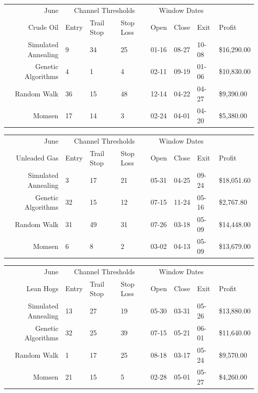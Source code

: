 \documentclass[12pt]{article}
\begin{document}
\begin{tabular}{|r|l|l|l|l|l|l|l|}
  \hline
  June & \multicolumn{3}{|c|}{Channel Thresholds} & \multicolumn{3}{|c|}{Window Dates} &  \\
  Crude Oil & Entry & Trail Stop & Stop Loss & Open & Close & Exit & Profit\\ \hline
  Simulated Annealing & 9 & 34 & 25 & 01-16 & 08-27 & 10-08 & \$16,290.00 \\ \hline
  Genetic Algorithms & 4 & 1 & 4 & 02-11 & 09-19 & 01-06 & \$10,830.00 \\ \hline
  Random Walk & 36 & 15 & 48 & 12-14 & 04-22 & 04-27 & \$9,390.00 \\ \hline
  Momsen & 17 & 14 & 3 & 02-24 & 04-01 & 04-20 & \$5,380.00 \\ \hline
\end{tabular}

\begin{tabular}{|r|l|l|l|l|l|l|l|}
  \hline
  June & \multicolumn{3}{|c|}{Channel Thresholds} & \multicolumn{3}{|c|}{Window Dates} &  \\
  Unleaded Gas & Entry & Trail Stop & Stop Loss & Open & Close & Exit & Profit\\ \hline
  Simulated Annealing & 3 & 17 & 21 & 05-31 & 04-25 & 09-24 & \$18,051.60 \\ \hline
  Genetic Algorithms & 32 & 15 & 12 & 07-15 & 11-24 & 05-16 & \$2,767.80 \\ \hline
  Random Walk & 31 & 49 & 31 & 07-26 & 03-18 & 05-09 & \$14,448.00 \\ \hline
  Momsen & 6 & 8 & 2 & 03-02 & 04-13 & 05-09 & \$13,679.00 \\ \hline
\end{tabular}

\begin{tabular}{|r|l|l|l|l|l|l|l|}
  \hline
  June & \multicolumn{3}{|c|}{Channel Thresholds} & \multicolumn{3}{|c|}{Window Dates} &  \\
  Lean Hogs & Entry & Trail Stop & Stop Loss & Open & Close & Exit & Profit\\ \hline
  Simulated Annealing & 13 & 27 & 19 & 05-30 & 03-31 & 05-26 & \$13,880.00 \\ \hline
  Genetic Algorithms & 32 & 25 & 39 & 07-15 & 05-21 & 06-01 & \$11,640.00 \\ \hline
  Random Walk & 1 & 17 & 25 & 08-18 & 03-17 & 05-24 & \$9,570.00 \\ \hline
  Momsen & 21 & 15 & 5 & 02-28 & 05-01 & 05-27 & \$4,260.00 \\ \hline
\end{tabular}
\end{document}
